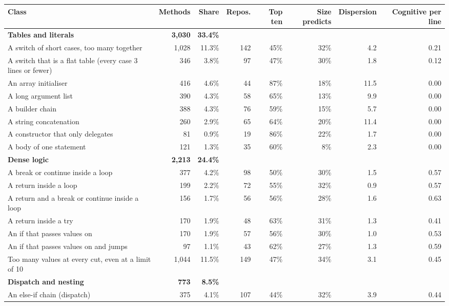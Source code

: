 \begin{tabular}{>{\raggedright\arraybackslash}p{6.6cm}rrrrrrr}
\toprule
Class & Methods & Share & Repos. & Top ten & Size predicts & Dispersion & Cognitive per line \\
\midrule
\textbf{Tables and literals} & \textbf{3{,}030} & \textbf{33.4\%} & & & & & \\
\quad A switch of short cases, too many together & 1{,}028 & 11.3\% & 142 & 45\% & 32\% & 4.2 & 0.21 \\
\quad A switch that is a flat table (every case 3 lines or fewer) & 346 & 3.8\% & 97 & 47\% & 30\% & 1.8 & 0.12 \\
\quad An array initialiser & 416 & 4.6\% & 44 & 87\% & 18\% & 11.5 & 0.00 \\
\quad A long argument list & 390 & 4.3\% & 58 & 65\% & 13\% & 9.9 & 0.00 \\
\quad A builder chain & 388 & 4.3\% & 76 & 59\% & 15\% & 5.7 & 0.00 \\
\quad A string concatenation & 260 & 2.9\% & 65 & 64\% & 20\% & 11.4 & 0.00 \\
\quad A constructor that only delegates & 81 & 0.9\% & 19 & 86\% & 22\% & 1.7 & 0.00 \\
\quad A body of one statement & 121 & 1.3\% & 35 & 60\% & 8\% & 2.3 & 0.00 \\
\textbf{Dense logic} & \textbf{2{,}213} & \textbf{24.4\%} & & & & & \\
\quad A break or continue inside a loop & 377 & 4.2\% & 98 & 50\% & 30\% & 1.5 & 0.57 \\
\quad A return inside a loop & 199 & 2.2\% & 72 & 55\% & 32\% & 0.9 & 0.57 \\
\quad A return and a break or continue inside a loop & 156 & 1.7\% & 56 & 56\% & 28\% & 1.6 & 0.63 \\
\quad A return inside a try & 170 & 1.9\% & 48 & 63\% & 31\% & 1.3 & 0.41 \\
\quad An if that passes values on & 170 & 1.9\% & 57 & 56\% & 30\% & 1.0 & 0.53 \\
\quad An if that passes values on and jumps & 97 & 1.1\% & 43 & 62\% & 27\% & 1.3 & 0.59 \\
\quad Too many values at every cut, even at a limit of 10 & 1{,}044 & 11.5\% & 149 & 47\% & 34\% & 3.1 & 0.45 \\
\textbf{Dispatch and nesting} & \textbf{773} & \textbf{8.5\%} & & & & & \\
\quad An else-if chain (dispatch) & 375 & 4.1\% & 107 & 44\% & 32\% & 3.9 & 0.44 \\

\end{tabular}
